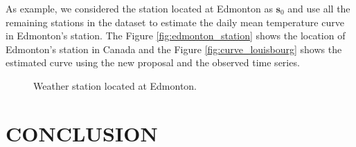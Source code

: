 \documentclass[12pt,]{article}
\theoremstyle{definition}
\theoremstyle{definition}
\theoremstyle{definition}
\theoremstyle{remark}
\begin{document}
As example, we considered the station located at Edmonton as \(\bm{s}_0\) and use all the remaining stations in the dataset to estimate the daily mean temperature curve in Edmonton's station. The Figure \ref{fig:edmonton_station} shows the location of Edmonton's station in Canada and the Figure \ref{fig:curve_louisbourg} shows the estimated curve using the new proposal and the observed time series.

\begin{figure}[htbp]
  \hfill
    \caption{Weather station located at Edmonton.}
\end{figure}

\hypertarget{sec:conclusion}{%
\section{CONCLUSION}\label{sec:conclusion}}
\end{document}

